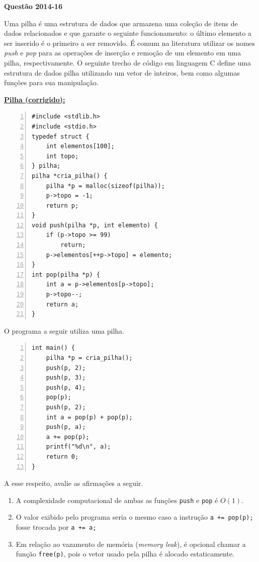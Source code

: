 \documentclass[12pt,a4paper]{article}
\newenvironment{question}[1]{%
    \pdfbookmark[3]{Questão #1}{q:#1}
    \label{q:#1}
    \bigskip\par\noindent
    \textbf{Questão #1} \dotfill
    \medskip\par\nopagebreak\noindent
    \ignorespaces
}{%
    \noindent\dotfill\medskip
}
\newcommand{\listtitle}[1]{%
    \medskip\par\noindent
    {\small\textbf{\underline{#1:}}}%
    \par\nopagebreak\noindent
}
\begin{document}
\begin{question}{2014-16}
Uma pilha é uma estrutura de dados que armazena uma coleção de itens de dados relacionados e que garante o seguinte funcionamento:
o último elemento a ser inserido é o primeiro a ser removido.
É comum na literatura utilizar os nomes \textit{push} e \textit{pop} para as operações de inserção e remoção de um elemento em uma pilha, respectivamente.
O seguinte trecho de código em linguagem C define uma estrutura de dados pilha utilizando um vetor de inteiros,
bem como algumas funções para sua manipulação.

\medskip\noindent\begin{minipage}{\linewidth}
\listtitle{Pilha (corrigido)}
\begin{Verbatim}[numbers=left]
#include <stdlib.h>
#include <stdio.h>
typedef struct {
    int elementos[100];
    int topo;
} pilha;
pilha *cria_pilha() {
    pilha *p = malloc(sizeof(pilha));
    p->topo = -1;
    return p;
}
void push(pilha *p, int elemento) {
    if (p->topo >= 99)
        return;
    p->elementos[++p->topo] = elemento;
}
int pop(pilha *p) {
    int a = p->elementos[p->topo];
    p->topo--;
    return a;
}
\end{Verbatim}
\medskip
\end{minipage}

\noindent
O programa a seguir utiliza uma pilha.

\begin{Verbatim}[numbers=left]
int main() {
    pilha *p = cria_pilha();
    push(p, 2);
    push(p, 3);
    push(p, 4);
    pop(p);
    push(p, 2);
    int a = pop(p) + pop(p);
    push(p, a);
    a += pop(p);
    printf("%d\n", a);
    return 0;
}
\end{Verbatim}

\noindent
A esse respeito, avalie as afirmações a seguir.

\begin{enumerate}[label=\Roman*.]
    \item A complexidade computacional de ambas as funções \texttt{push} e \texttt{pop} é $O(1)$.
    \item O valor exibido pelo programa seria o mesmo caso a instrução \texttt{a += pop(p);} fosse trocada por \texttt{a += a;}
    \item Em relação ao vazamento de memória (\textit{memory leak}), é opcional chamar a função \texttt{free(p)},
    pois o vetor usado pela pilha é alocado estaticamente.
\end{enumerate}


\end{question}
\end{document}
